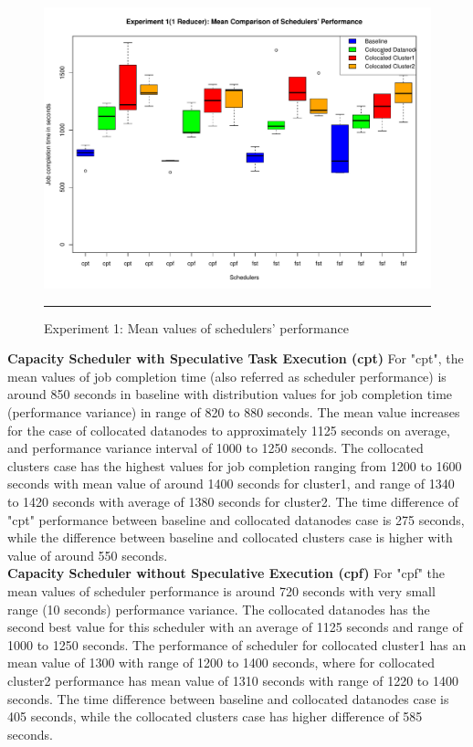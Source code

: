 \begin{figure}[htbp]
  \centering
    \includegraphics[width=\textwidth,height=\textheight,keepaspectratio]{./Figures/exp_1_mean.pdf}
    \rule{35em}{0.5pt}
  \caption{Experiment 1: Mean values of schedulers' performance }
  \label{fig:exp_1_mean}
\end{figure} 


\textbf{Capacity Scheduler with Speculative Task Execution (cpt)} For "cpt", the mean values of job completion time (also referred as scheduler performance)  is around 850 seconds in baseline with distribution values for job completion time (performance variance) in range of 820 to 880 seconds. The mean value increases for the case of collocated datanodes to approximately 1125 seconds on average, and performance variance interval of 1000 to 1250 seconds. The collocated clusters case has the highest values for job completion ranging from 1200 to 1600 seconds with mean value of around 1400 seconds for cluster1, and range of 1340 to 1420 seconds with average of 1380 seconds for cluster2. The time difference of "cpt" performance between baseline and collocated datanodes case is 275 seconds, while the difference between baseline and collocated clusters case is higher with value of around 550 seconds.\\  

\textbf{Capacity Scheduler without Speculative Execution (cpf)} For "cpf" the mean values of scheduler performance is around 720 seconds with very small range (10 seconds) performance variance. The collocated datanodes has the second best value for this scheduler with an average of 1125 seconds and range of 1000 to 1250 seconds. The performance of scheduler for collocated cluster1 has an mean value of 1300 with range of 1200 to 1400 seconds, where for collocated cluster2 performance has mean value of 1310 seconds with range of 1220 to 1400 seconds. The time difference between baseline and collocated datanodes case is 405 seconds, while the collocated clusters case has higher difference of 585 seconds.\\   


